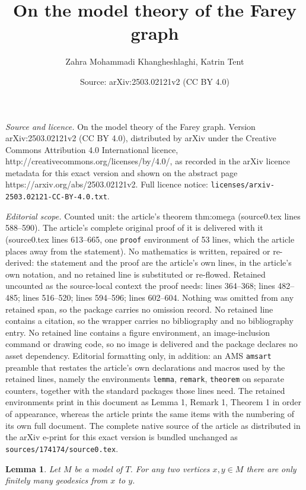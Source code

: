 \documentclass[10pt,a4paper]{amsart}
\title{On the model theory of the Farey graph}
\author{Zahra Mohammadi Khangheshlaghi, Katrin Tent}
\date{Source: arXiv:2503.02121v2 (CC BY 4.0)}
\newtheorem{lemma}{Lemma}
\begin{document}
\maketitle

\noindent\emph{Source and licence.} On the model theory of the Farey graph. Version arXiv:2503.02121v2 (CC BY 4.0), distributed by arXiv under the Creative Commons Attribution 4.0 International licence, http://creativecommons.org/licenses/by/4.0/, as recorded in the arXiv licence metadata for this exact version and shown on the abstract page https://arxiv.org/abs/2503.02121v2. Full licence notice: \texttt{licenses/arxiv-2503.02121-CC-BY-4.0.txt}.\par\smallskip

\noindent\textit{Editorial scope.} Counted unit: the article's theorem thm:omega (source0.tex lines 588--590). The article's complete original proof of it is delivered with it (source0.tex lines 613--665, one \texttt{proof} environment of 53 lines, which the article places away from the statement). No mathematics is written, repaired or re-derived: the statement and the proof are the article's own lines, in the article's own notation, and no retained line is substituted or re-flowed.  Retained uncounted as the source-local context the proof needs: lines 364--368; lines 482--485; lines 516--520; lines 594--596; lines 602--604.  Nothing was omitted from any retained span, so the package carries no omission record.  No retained line contains a citation, so the wrapper carries no bibliography and no bibliography entry.  No retained line contains a figure environment, an image-inclusion command or drawing code, so no image is delivered and the package declares no asset dependency.  Editorial formatting only, in addition: an AMS \texttt{amsart} preamble that restates the article's own declarations and macros used by the retained lines, namely the environments \texttt{lemma}, \texttt{remark}, \texttt{theorem} on separate counters, together with the standard packages those lines need.  The retained environments print in this document as Lemma 1, Remark 1, Theorem 1 in order of appearance, whereas the article prints the same items with the numbering of its own full document.  The complete native source of the article as distributed in the arXiv e-print for this exact version is bundled unchanged as \texttt{sources/174174/source0.tex}.
\begin{lemma}\label{lem:finitely_many_path}
Let $M$ be a model of $T$.
    For  any two vertices $x, y\in M$ 
  there are only finitely many geodesics from $x$ to $y$.
\end{lemma}
\end{document}
